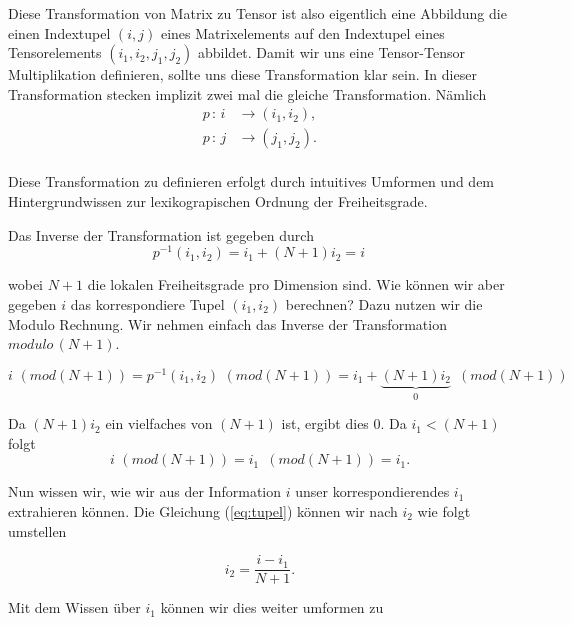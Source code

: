 Diese Transformation von Matrix zu Tensor ist also eigentlich eine Abbildung die einen Indextupel $(i,j)$ eines Matrixelements auf den Indextupel eines Tensorelements $(i_1,i_2,j_1,j_2)$ abbildet. Damit wir uns eine Tensor-Tensor Multiplikation definieren, sollte uns diese Transformation klar sein.
In dieser Transformation stecken implizit zwei mal die gleiche Transformation. Nämlich
\begin{equation*}
\begin{aligned}
p \, : \, i &\rightarrow (i_1,i_2) ,\\
p \, : \, j &\rightarrow (j_1,j_2) .\\
\end{aligned}
\end{equation*}

Diese Transformation zu definieren erfolgt durch intuitives Umformen und dem Hintergrundwissen zur lexikograpischen Ordnung der Freiheitsgrade.

Das Inverse der Transformation ist gegeben durch
\begin{equation} \label{eq:tupel}
p^{-1}(i_1,i_2) = i_1 + (N+1)i_2 = i \, 
\end{equation}

wobei $N+1$ die lokalen Freiheitsgrade pro Dimension sind.
Wie können wir aber gegeben $i$ das korrespondiere Tupel $(i_1,i_2)$ berechnen?
Dazu nutzen wir die Modulo Rechnung. Wir nehmen einfach das Inverse der Transformation $modulo \, (N+1)$. 

\begin{equation}
i \, \, (mod (N+1))=p^{-1}(i_1,i_2) \, \, (mod (N+1)) = i_1 + \underbrace{(N+1)i_2}_{0} \, \, \, (mod (N+1)) 
\end{equation}

Da $(N+1)i_2$ ein vielfaches von $(N+1)$ ist, ergibt dies 0. Da $i_1 < (N+1)$ folgt 
\begin{equation}
i \, \, (mod (N+1)) = i_1 \, \, \, (mod (N+1)) = i_1.
\end{equation}

Nun wissen wir, wie wir aus der Information $i$ unser korrespondierendes $i_1$ extrahieren können. Die Gleichung (\ref{eq:tupel}) können wir nach $i_2$ wie folgt umstellen

\begin{equation} \label{eq:tupel2}
 i_2 = \dfrac{ i - i_1 } {N+1}.
\end{equation}

Mit dem Wissen über $i_1$ können wir dies weiter umformen zu

